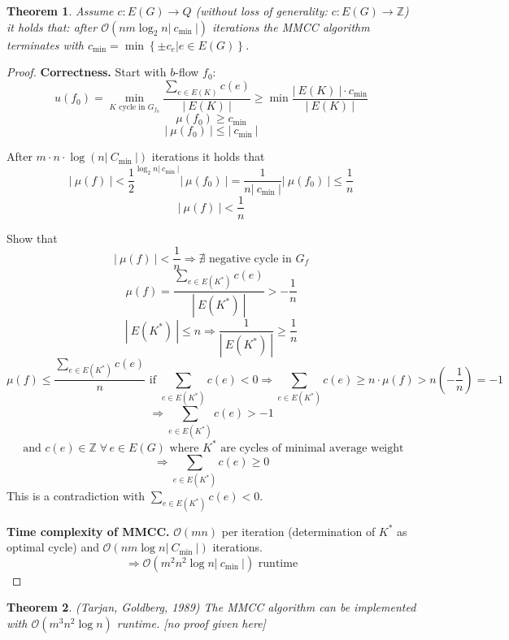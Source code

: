\documentclass{article}
\newtheorem{theorem}{Theorem}
\newcommand{\card}[1]{\left|\:\!#1\:\!\right|}
\newcommand{\set}[1]{\left\{#1\right\}}
\newcommand{\fall}{\;\forall\,}
\begin{document}
\begin{theorem}\label{proposition-5.6}
  Assume $c: E(G) \rightarrow Q$ (without loss of generality: $c: E(G) \rightarrow \mathbb{Z}$) it holds that:
  after $\mathcal{O}(nm \log_2{n} \card{c_{\text{min}}})$ iterations the MMCC algorithm terminates with
  $c_{\text{min}} = \min\set{\pm c_e | e \in E(G)}$.
\end{theorem}

\begin{proof}
  \textbf{Correctness.}
  Start with $b$-flow $f_0$:
  \[
    u(f_0) = \min_{K \text{ cycle in } G_{f_0}} \frac{\sum_{e \in E(K)} c(e)}{\card{E(K)}}
      \geq \min\frac{\card{E(K)} \cdot c_{\text{min}}}{\card{E(K)}}
  \] \[
    \mu(f_0) \geq c_{\text{min}}
  \] \[
    \card{\mu(f_0)} \leq \card{c_{\text{min}}}
  \]

  After $m\cdot n\cdot \log(n\card{C_{\text{min}}})$ iterations it holds that
  \[
    \card{\mu(f)}
      < {\frac12}^{\log_2{n\card{c_{\text{min}}}}} \card{\mu(f_0)}
      = \frac{1}{n\card{c_{\text{min}}}} \card{\mu(f_0)} \leq \frac1{n}
  \] \[
    \card{\mu(f)} < \frac1{n}
  \]

  Show that
  \[
    \card{\mu(f)} < \frac1{n} \Rightarrow \nexists \text{ negative cycle in } G_f
  \] \[
    \mu(f) = \frac{\sum_{e \in E(K^*)} c(e)}{\card{E(K^*)}} > -\frac1n
  \] \[
    \card{E(K^*)} \leq n \Rightarrow \frac{1}{\card{E(K^*)}} \geq \frac1n
  \] \[
    \mu(f) \leq \frac{\sum_{e \in E(K^*)} c(e)}{n}
      \text{ if } \sum_{e \in E(K^*)} c(e) < 0 \Rightarrow \sum_{e \in E(K^*)} c(e)
      \geq n \cdot \mu(f)
      > n \left(-\frac1n\right) = -1
  \] \[
    \Rightarrow \sum_{e \in E(K^*)} c(e) > -1
  \] \[
    \text{ and } c(e) \in \mathbb{Z} \fall e \in E(G)
      \text{ where $K^*$ are cycles of minimal average weight}
  \] \[
    \Rightarrow \sum_{e \in E(K^*)} c(e) \geq 0
  \]
  This is a contradiction with $\sum_{e \in E(K^*)} c(e) < 0$.

  \textbf{Time complexity of MMCC.}
    $\mathcal{O}(mn)$ per iteration (determination of $K^*$ as optimal cycle)
    and $\mathcal{O}(nm\log{n} \card{C_{\text{min}}})$ iterations.
    \[ \Rightarrow \mathcal{O}(m^2 n^2 \log{n \card{c_{\text{min}}}}) \text{ runtime} \]
\end{proof}

\begin{theorem}\label{satz-5.7}
  (Tarjan, Goldberg, 1989)
  The MMCC algorithm can be implemented with $\mathcal{O}(m^3 n^2 \log{n})$ runtime.
  [no proof given here]
\end{theorem}
\end{document}
